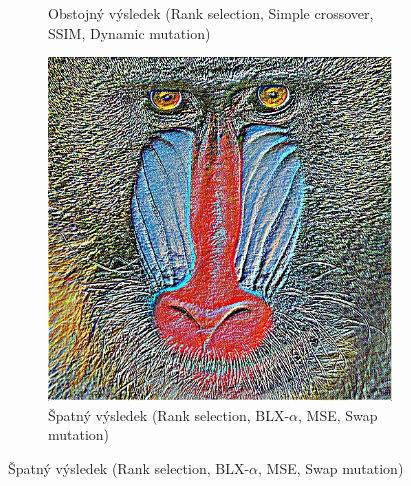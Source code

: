 \documentclass[a4paper,11pt]{scrartcl}
\begin{document}
\begin{figure}[!h]
\begin{subfigure}[b]{0.32\textwidth}
        \caption{Obstojný výsledek (Rank selection, Simple crossover, SSIM, Dynamic mutation)}
        \label{fig:ex12}
    \end{subfigure}
    \begin{subfigure}[b]{0.32\textwidth}
        \includegraphics[width=\textwidth]{img/ranksel-blx_a-mse-swap_example1.jpg}
        \caption{Špatný výsledek (Rank selection, BLX-$\alpha$, MSE, Swap mutation)}
        \label{fig:ex13}
    \end{subfigure}
\end{figure}
\end{document}
